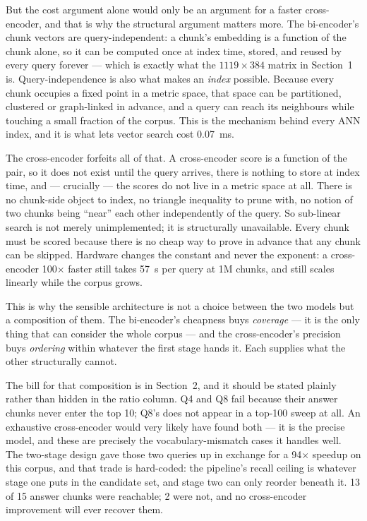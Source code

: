 \documentclass[11pt,a4paper]{article}
\begin{document}
But the cost argument alone would only be an argument for a faster
cross-encoder, and that is why the structural argument matters more. The
bi-encoder's chunk vectors are query-independent: a chunk's embedding is a
function of the chunk alone, so it can be computed once at index time, stored,
and reused by every query forever --- which is exactly what the $1119 \times
384$ matrix in Section~1 is. Query-independence is also what makes an
\emph{index} possible. Because every chunk occupies a fixed point in a metric
space, that space can be partitioned, clustered or graph-linked in advance, and
a query can reach its neighbours while touching a small fraction of the corpus.
This is the mechanism behind every ANN index, and it is what lets vector search
cost 0.07~ms.

The cross-encoder forfeits all of that. A cross-encoder score is a function of
the pair, so it does not exist until the query arrives, there is nothing to
store at index time, and --- crucially --- the scores do not live in a metric
space at all. There is no chunk-side object to index, no triangle inequality to
prune with, no notion of two chunks being ``near'' each other independently of
the query. So sub-linear search is not merely unimplemented; it is structurally
unavailable. Every chunk must be scored because there is no cheap way to prove
in advance that any chunk can be skipped. Hardware changes the constant and
never the exponent: a cross-encoder 100$\times$ faster still takes 57~s per
query at 1M chunks, and still scales linearly while the corpus grows.

This is why the sensible architecture is not a choice between the two models
but a composition of them. The bi-encoder's cheapness buys \emph{coverage} ---
it is the only thing that can consider the whole corpus --- and the
cross-encoder's precision buys \emph{ordering} within whatever the first stage
hands it. Each supplies what the other structurally cannot.

The bill for that composition is in Section~2, and it should be stated plainly
rather than hidden in the ratio column. Q4 and Q8 fail because their answer
chunks never enter the top 10; Q8's does not appear in a top-100 sweep at all.
An exhaustive cross-encoder would very likely have found both --- it is the
precise model, and these are precisely the vocabulary-mismatch cases it handles
well. The two-stage design gave those two queries up in exchange for a 94$\times$
speedup on this corpus, and that trade is hard-coded: the pipeline's recall
ceiling is whatever stage one puts in the candidate set, and stage two can only
reorder beneath it. 13 of 15 answer chunks were reachable; 2 were not, and no
cross-encoder improvement will ever recover them.
\end{document}
